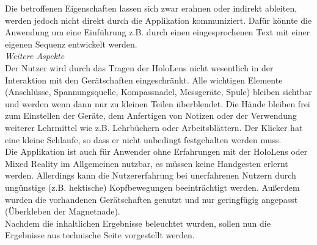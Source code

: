 Die betroffenen Eigenschaften lassen sich zwar erahnen oder indirekt ableiten, werden jedoch nicht direkt durch die Applikation kommuniziert. Dafür könnte die Anwendung um eine Einführung z.B. durch einen eingesprochenen Text mit einer eigenen Sequenz entwickelt werden.\\

\textit{Weitere Aspekte}\\
Der Nutzer wird durch das Tragen der HoloLens nicht wesentlich in der Interaktion mit den Gerätschaften eingeschränkt. Alle wichtigen Elemente (Anschlüsse, Spannungsquelle, Kompassnadel, Messgeräte, Spule) bleiben sichtbar und werden wenn dann nur zu kleinen Teilen überblendet. Die Hände bleiben frei zum Einstellen der Geräte, dem Anfertigen von Notizen oder der Verwendung weiterer Lehrmittel wie z.B. Lehrbüchern oder Arbeitsblättern. Der Klicker hat eine kleine Schlaufe, so dass er nicht unbedingt festgehalten werden muss.\\

Die Applikation ist auch für Anwender ohne Erfahrungen mit der HoloLens oder Mixed Reality im Allgemeinen nutzbar, es müssen keine Handgesten erlernt werden. Allerdings kann die Nutzererfahrung bei unerfahrenen Nutzern durch ungünstige (z.B. hektische) Kopfbewegungen beeinträchtigt werden. Außerdem wurden die vorhandenen Gerätschaften genutzt und nur geringfügig angepasst (Überkleben der Magnetnade).\\

Nachdem die inhaltlichen Ergebnisse beleuchtet wurden, sollen nun die Ergebnisse aus technische Seite  vorgestellt werden.

